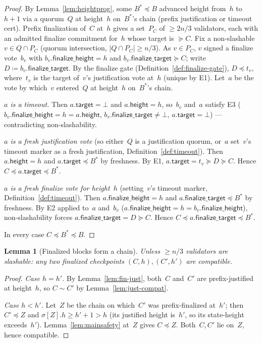 \ifx\litemode\undefined\documentclass{article}\fi
\newcommand{\target}{\mathsf{target}}
\newcommand{\height}{\mathsf{height}}
\newcommand{\finalizeHeight}{\mathsf{finalize\_height}}
\newcommand{\finalizeTarget}{\mathsf{finalize\_target}}
\theoremstyle{plain}
\newtheorem{lemma}{Lemma}
\theoremstyle{definition}
\theoremstyle{remark}
\begin{document}
\begin{proof}
By Lemma~\ref{lem:heightprog}, some $B^* \preceq B$ advanced height from~$h$ to~$h+1$ via a quorum~$Q$ at height~$h$ on~$B^*$'s chain (prefix justification or timeout cert).
Prefix finalization of~$C$ at~$h$ gives a set~$P_C$ of $\geq 2n/3$ validators, each with an admitted finalize commitment for~$h$ whose target is $\succeq C$.
Fix a non-slashable $v \in Q \cap P_C$ (quorum intersection, $|Q \cap P_C| \geq n/3$).
As $v \in P_C$, $v$ signed a finalize vote~$b_v$ with $b_v.\finalizeHeight = h$ and $b_v.\finalizeTarget \succeq C$; write $D \coloneqq b_v.\finalizeTarget$.
By the finalize gate (Definition~\ref{def:finalize-gate}), $D \preceq t_v$, where~$t_v$ is the target of~$v$'s justification vote at~$h$ (unique by E1).
Let~$a$ be the vote by which~$v$ entered~$Q$ at height~$h$ on~$B^*$'s chain.

\emph{$a$ is a timeout.} Then $a.\target = \bot$ and $a.\height = h$, so~$b_v$ and~$a$ satisfy E3 ($b_v.\finalizeHeight = h = a.\height$, $b_v.\finalizeTarget \neq \bot$, $a.\target = \bot$) --- contradicting non-slashability.

\emph{$a$ is a fresh justification vote} (so either~$Q$ is a justification quorum, or~$a$ set~$v$'s timeout marker as a fresh justification, Definition~\ref{def:timeout}). Then $a.\height = h$ and $a.\target \preceq B^*$ by freshness. By E1, $a.\target = t_v \succeq D \succeq C$. Hence $C \preceq a.\target \preceq B^*$.

\emph{$a$ is a fresh finalize vote for height~$h$} (setting~$v$'s timeout marker, Definition~\ref{def:timeout}). Then $a.\finalizeHeight = h$ and $a.\finalizeTarget \preceq B^*$ by freshness. By E2 applied to~$a$ and~$b_v$ ($a.\finalizeHeight = h = b_v.\finalizeHeight$), non-slashability forces $a.\finalizeTarget = D \succeq C$. Hence $C \preceq a.\finalizeTarget \preceq B^*$.

In every case $C \preceq B^* \preceq B$.
\end{proof}

\begin{lemma}[Finalized blocks form a chain]\label{lem:finchain}
Unless $\geq n/3$ validators are slashable: any two finalized checkpoints $(C, h), (C', h')$ are compatible.
\end{lemma}

\begin{proof}
\emph{Case $h = h'$.}
By Lemma~\ref{lem:fin-just}, both~$C$ and~$C'$ are prefix-justified at height~$h$, so $C \sim C'$ by Lemma~\ref{lem:just-compat}.

\emph{Case $h < h'$.}
Let~$Z$ be the chain on which~$C'$ was prefix-finalized at~$h'$; then $C' \preceq Z$ and $\sigma[Z].h \geq h' + 1 > h$ (its justified height is~$h'$, so its state-height exceeds~$h'$).
Lemma~\ref{lem:mainsafety} at~$Z$ gives $C \preceq Z$.
Both~$C, C'$ lie on~$Z$, hence compatible.
\end{proof}
\end{document}
